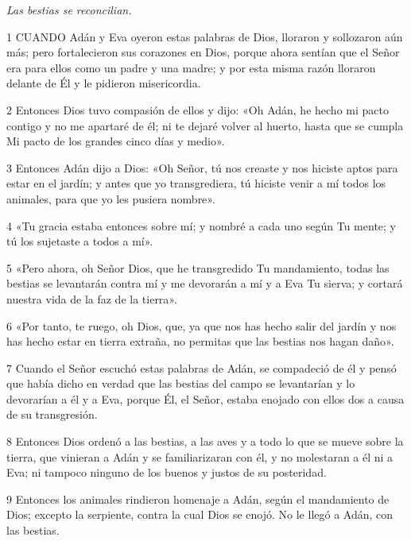 \par \textit{Las bestias se reconcilian.}

\par 1 CUANDO Adán y Eva oyeron estas palabras de Dios, lloraron y sollozaron aún más; pero fortalecieron sus corazones en Dios, porque ahora sentían que el Señor era para ellos como un padre y una madre; y por esta misma razón lloraron delante de Él y le pidieron misericordia.

\par 2 Entonces Dios tuvo compasión de ellos y dijo: «Oh Adán, he hecho mi pacto contigo y no me apartaré de él; ni te dejaré volver al huerto, hasta que se cumpla Mi pacto de los grandes cinco días y medio».

\par 3 Entonces Adán dijo a Dios: «Oh Señor, tú nos creaste y nos hiciste aptos para estar en el jardín; y antes que yo transgrediera, tú hiciste venir a mí todos los animales, para que yo les pusiera nombre».

\par 4 «Tu gracia estaba entonces sobre mí; y nombré a cada uno según Tu mente; y tú los sujetaste a todos a mí».

\par 5 «Pero ahora, oh Señor Dios, que he transgredido Tu mandamiento, todas las bestias se levantarán contra mí y me devorarán a mí y a Eva Tu sierva; y cortará nuestra vida de la faz de la tierra».

\par 6 «Por tanto, te ruego, oh Dios, que, ya que nos has hecho salir del jardín y nos has hecho estar en tierra extraña, no permitas que las bestias nos hagan daño».

\par 7 Cuando el Señor escuchó estas palabras de Adán, se compadeció de él y pensó que había dicho en verdad que las bestias del campo se levantarían y lo devorarían a él y a Eva, porque Él, el Señor, estaba enojado con ellos dos a causa de su transgresión.

\par 8 Entonces Dios ordenó a las bestias, a las aves y a todo lo que se mueve sobre la tierra, que vinieran a Adán y se familiarizaran con él, y no molestaran a él ni a Eva; ni tampoco ninguno de los buenos y justos de su posteridad.

\par 9 Entonces los animales rindieron homenaje a Adán, según el mandamiento de Dios; excepto la serpiente, contra la cual Dios se enojó. No le llegó a Adán, con las bestias.

